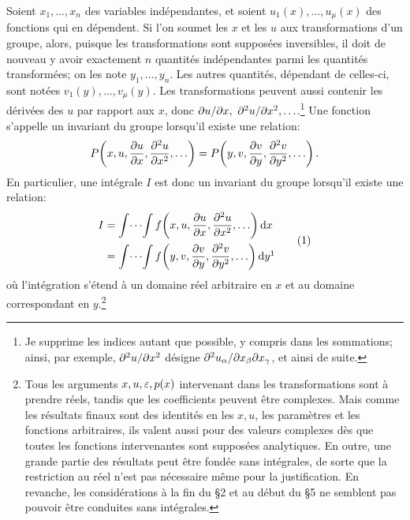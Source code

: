 Soient \(x_1,\ldots,x_n\) des variables indépendantes, et soient \(u_1(x),\ldots,u_\mu(x)\) des fonctions qui en dépendent. Si l'on soumet les \(x\) et les \(u\) aux transformations d'un groupe, alors, puisque les transformations sont supposées inversibles, il doit de nouveau y avoir exactement \(n\) quantités indépendantes parmi les quantités transformées; on les note \(y_1,\ldots,y_n\). Les autres quantités, dépendant de celles-ci, sont notées \(v_1(y),\ldots,v_\mu(y)\). Les transformations peuvent aussi contenir les dérivées des \(u\) par rapport aux \(x\), donc \(\partial u/\partial x,\ \partial^2u/\partial x^2,\ldots\).\footnote{Je supprime les indices autant que possible, y compris dans les sommations; ainsi, par exemple, \(\partial^2u/\partial x^2\) désigne \(\partial^2u_\alpha/\partial x_\beta\partial x_\gamma\), et ainsi de suite.} Une fonction s'appelle un invariant du groupe lorsqu'il existe une relation:
\[
P\!\left(x,u,\frac{\partial u}{\partial x},\frac{\partial^2u}{\partial x^2},\ldots\right)
 =
P\!\left(y,v,\frac{\partial v}{\partial y},\frac{\partial^2v}{\partial y^2},\ldots\right).
\]
En particulier, une intégrale \(I\) est donc un invariant du groupe lorsqu'il existe une relation:
\begin{equation}
\begin{aligned}
I&=\int\!\cdots\!\int f\!\left(x,u,\frac{\p u}{\p x},\frac{\p^2u}{\p x^2},\ldots\right)\dd x\\
 &=\int\!\cdots\!\int f\!\left(y,v,\frac{\p v}{\p y},\frac{\p^2v}{\p y^2},\ldots\right)\dd y\footnotemark
\end{aligned}
\tag{1}
\end{equation}
où l'intégration s'étend à un domaine réel arbitraire en \(x\) et au domaine correspondant en \(y\).\footnote{Tous les arguments \(x,u,\varepsilon,p(x)\) intervenant dans les transformations sont à prendre réels, tandis que les coefficients peuvent être complexes. Mais comme les résultats finaux sont des identités en les \(x,u\), les paramètres et les fonctions arbitraires, ils valent aussi pour des valeurs complexes dès que toutes les fonctions intervenantes sont supposées analytiques. En outre, une grande partie des résultats peut être fondée sans intégrales, de sorte que la restriction au réel n'est pas nécessaire même pour la justification. En revanche, les considérations à la fin du \S{}2 et au début du \S{}5 ne semblent pas pouvoir être conduites sans intégrales.}

